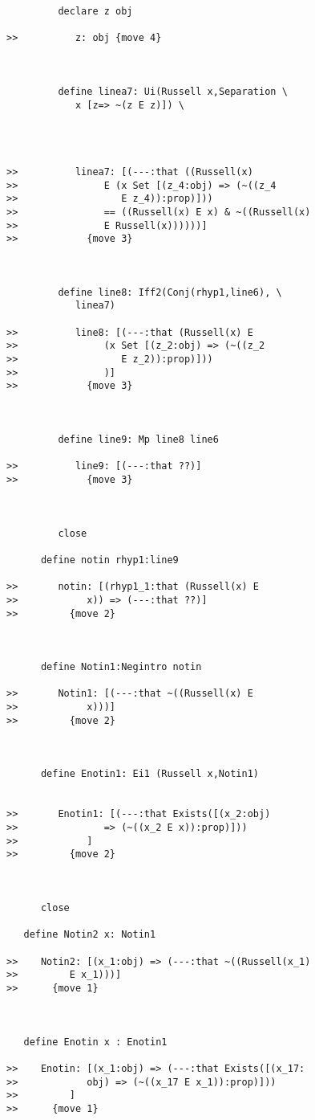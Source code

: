 \documentclass[12pt]{article}
\begin{document}
\begin{verbatim}
         declare z obj

>>          z: obj {move 4}



         define linea7: Ui(Russell x,Separation \
            x [z=> ~(z E z)]) \
            



>>          linea7: [(---:that ((Russell(x)
>>               E (x Set [(z_4:obj) => (~((z_4
>>                  E z_4)):prop)]))
>>               == ((Russell(x) E x) & ~((Russell(x)
>>               E Russell(x))))))]
>>            {move 3}



         define line8: Iff2(Conj(rhyp1,line6), \
            linea7)

>>          line8: [(---:that (Russell(x) E
>>               (x Set [(z_2:obj) => (~((z_2
>>                  E z_2)):prop)]))
>>               )]
>>            {move 3}



         define line9: Mp line8 line6

>>          line9: [(---:that ??)]
>>            {move 3}



         close

      define notin rhyp1:line9

>>       notin: [(rhyp1_1:that (Russell(x) E
>>            x)) => (---:that ??)]
>>         {move 2}



      define Notin1:Negintro notin

>>       Notin1: [(---:that ~((Russell(x) E
>>            x)))]
>>         {move 2}



      define Enotin1: Ei1 (Russell x,Notin1)


>>       Enotin1: [(---:that Exists([(x_2:obj)
>>               => (~((x_2 E x)):prop)]))
>>            ]
>>         {move 2}



      close

   define Notin2 x: Notin1

>>    Notin2: [(x_1:obj) => (---:that ~((Russell(x_1)
>>         E x_1)))]
>>      {move 1}



   define Enotin x : Enotin1

>>    Enotin: [(x_1:obj) => (---:that Exists([(x_17:
>>            obj) => (~((x_17 E x_1)):prop)]))
>>         ]
>>      {move 1}




\end{verbatim}
\end{document}
